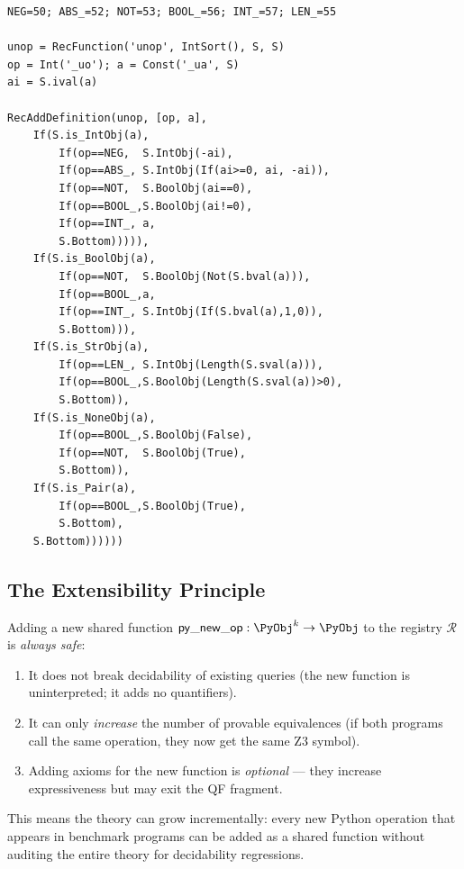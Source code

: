 \begin{lstlisting}[caption={unop: complete Z3 implementation}]
NEG=50; ABS_=52; NOT=53; BOOL_=56; INT_=57; LEN_=55

unop = RecFunction('unop', IntSort(), S, S)
op = Int('_uo'); a = Const('_ua', S)
ai = S.ival(a)

RecAddDefinition(unop, [op, a],
    If(S.is_IntObj(a),
        If(op==NEG,  S.IntObj(-ai),
        If(op==ABS_, S.IntObj(If(ai>=0, ai, -ai)),
        If(op==NOT,  S.BoolObj(ai==0),
        If(op==BOOL_,S.BoolObj(ai!=0),
        If(op==INT_, a,
        S.Bottom))))),
    If(S.is_BoolObj(a),
        If(op==NOT,  S.BoolObj(Not(S.bval(a))),
        If(op==BOOL_,a,
        If(op==INT_, S.IntObj(If(S.bval(a),1,0)),
        S.Bottom))),
    If(S.is_StrObj(a),
        If(op==LEN_, S.IntObj(Length(S.sval(a))),
        If(op==BOOL_,S.BoolObj(Length(S.sval(a))>0),
        S.Bottom)),
    If(S.is_NoneObj(a),
        If(op==BOOL_,S.BoolObj(False),
        If(op==NOT,  S.BoolObj(True),
        S.Bottom)),
    If(S.is_Pair(a),
        If(op==BOOL_,S.BoolObj(True),
        S.Bottom),
    S.Bottom))))))
\end{lstlisting}

\subsection{The Extensibility Principle}

\begin{theorem}
\label{thm:safe-extension}
Adding a new shared function $\mathsf{py\_new\_op} : \PyObj^k \to
\PyObj$ to the registry $\mathcal{R}$ is \emph{always safe}:
\begin{enumerate}
  \item It does not break decidability of existing queries (the new
    function is uninterpreted; it adds no quantifiers).
  \item It can only \emph{increase} the number of provable
    equivalences (if both programs call the same operation, they
    now get the same Z3 symbol).
  \item Adding axioms for the new function is \emph{optional} ---
    they increase expressiveness but may exit the QF fragment.
\end{enumerate}
\end{theorem}

This means the theory can grow incrementally: every new Python
operation that appears in benchmark programs can be added as a shared
function without auditing the entire theory for decidability regressions.


